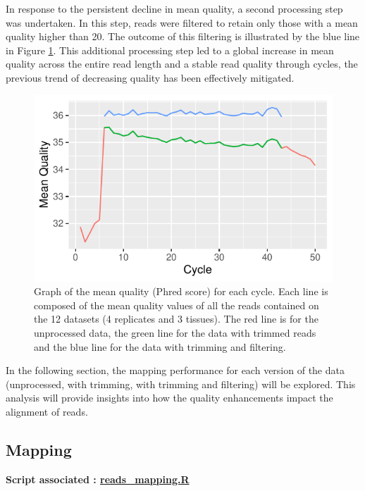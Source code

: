 \documentclass[a4paper, 11pt]{article}
\begin{document}
\begin{multicols}{2}
In response to the persistent decline in mean quality, a second processing step was undertaken. In this step, reads were filtered to retain only those with a mean quality higher than 20. The outcome of this filtering is illustrated by the blue line in Figure \ref{fig:cycles_mean}. This additional processing step led to a global increase in mean quality across the entire read length and a stable read quality through cycles, the previous trend of decreasing quality has been effectively mitigated.


\begin{figure}[H]
    \centering
    \includegraphics[width=1\columnwidth]{Figures/QC_plots/mean_per_group_and_cycles.pdf}
    \caption{\footnotesize{ Graph of the mean quality (Phred score) for each cycle. Each line is composed of the mean quality values of all the reads contained on the 12 datasets (4 replicates and 3 tissues). The red line is for the unprocessed data, the green line for the data with trimmed reads and the blue line for the data with trimming and filtering.}}
    \label{fig:cycles_mean}
\end{figure}

In the following section, the mapping performance for each version of the data (unprocessed, with trimming, with trimming and filtering) will be explored. This analysis will provide insights into how the quality enhancements impact the alignment of reads.

\subsection{Mapping}
\begin{scriptsize}
	\textbf{Script associated : \href{https://github.com/leopoldguyot/BINF-402_Transcriptomic_Project/blob/main/reads_mapping.R}{reads\_mapping.R}} 
\end{scriptsize}



\end{multicols}
\end{document}

